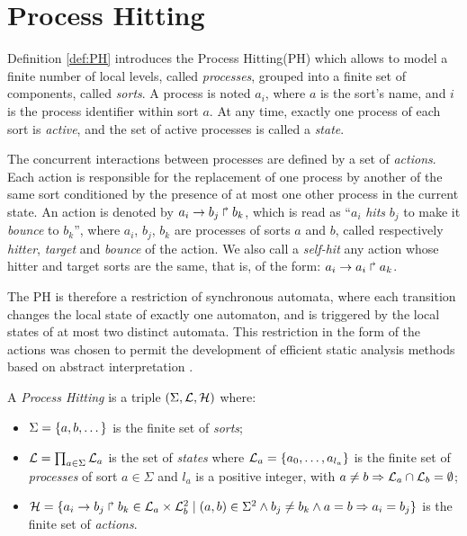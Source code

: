 

\section{Process Hitting }

Definition \ref{def:PH} introduces the Process Hitting(PH) \cite{PMR10-TCSB}
which allows to model a finite number of local levels,
called \emph{processes},
grouped into a finite set of components, called \emph{sorts}.
A process is noted $a_i$, where $a$ is the sort's name,
and $i$ is the process identifier within sort $a$.
At any time, exactly one process of each sort is \emph{active},
and the set of active processes is called a \emph{state}.

The concurrent interactions between processes are defined by a set of \emph{actions}.
Each action is responsible for the replacement of one process by another of the same sort
conditioned by the presence of at most one other process in the current state.
An action is denoted by $a_i\rightarrow b_j\Rsh b_k$, which is read as
“$a_i$ \emph{hits} $b_j$ to make it \emph{bounce} to $b_k$”,
where $a_i$, $b_j$, $b_k$ are processes of sorts $a$ and $b$,
called respectively \emph{hitter}, \emph{target} and
\emph{bounce} of the action.
We also call a \emph{self-hit} any action whose hitter and target sorts are the same,
that is, of the form: $a_i\rightarrow a_i\Rsh a_k$.

The PH is therefore a restriction of synchronous automata, where each transition
changes the local state of exactly one automaton,
and is triggered by the local states of at most two distinct automata.
This restriction in the form of the actions was chosen to permit
the development of efficient static analysis methods
based on abstract interpretation \cite{PMR12-MSCS}.

\begin{definition}\label{def:PH}
  A \emph{Process Hitting} is a triple $(\Sigma,\mathcal{L},\mathcal{H})$ where:
  \begin{itemize}
    \item  $\Sigma = \{a,b,\dots\}$ is the finite set of \emph{sorts};
    \item  $\mathcal{L} = \prod_{a\in\Sigma} \mathcal{L}_a$ is the set of \emph{states} where
      $\mathcal{L}_a = \{a_0,\dots,a_{l_a}\}$
      is the finite set of \emph{processes} of sort $a\in\Sigma$
      and $l_a$ is a positive integer, with $a\neq b\Rightarrow \mathcal{L}_a \cap \mathcal{L}_b = \emptyset$;
    \item  $\mathcal{H} = \{ a_i\rightarrow b_j\Rsh b_k \in \mathcal{L}_a \times \mathcal{L}_b^2 \mid
      (a,b) \in \Sigma^2 \wedge b_j\neq b_k \wedge a=b\Rightarrow a_i=b_j\}$
      is the finite set of \emph{actions}.
  \end{itemize}
\end{definition}

